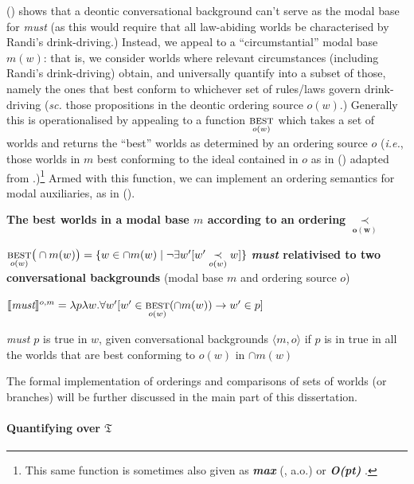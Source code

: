 \documentclass[11pt,dvipsnames]{report}
\providecommand{\denote}[2][]{\ensuremath{\llbracket{#2}\rrbracket^{#1}}}
\begin{document}
\noindent(\lastx) shows that a deontic conversational background can't serve as the modal base for \textit{must} (as this would require that all law-abiding worlds be characterised by Randi's drink-driving.) Instead, we appeal to a ``circumstantial'' modal base $ m(w) $: that is, we consider worlds where relevant circumstances (including Randi's drink-driving) obtain, and universally quantify into a subset of those, namely the ones that best conform to whichever set of rules/laws govern drink-driving (\textit{sc.} those propositions in the deontic ordering source $ o(w) $.) Generally this is operationalised by appealing to a function $ \underset{o(w)}{\textsc{best}}$ which takes a set of worlds and returns the ``best'' worlds as determined by an ordering source $ o $ (\textit{i.e.}, those worlds in $ m $ best conforming to the ideal contained in $ o $ as in (\nextx) adapted from \citealp[61]{VonFintel2011}.)\footnote{This same function is sometimes also given as \textbf{\textit{max}} (\citealp[\textit{e.g.},][]{Hacquard2006,VonFintel2008,VonFintel2011}, a.o.) or \textbf{\textit{O(pt)}} \citep[247]{Schwager2006}.} Armed with this function, we can implement an ordering semantics for modal auxiliaries, as in ().

\ex \textbf{The best worlds in a modal base $ m $ according to an ordering} $\boldsymbol{\underset{o(w)}{\prec}}$

$ \underset{o(w)}{\textsc{best}}\big(\cap{m(w)}\big)=\{w\in\cap m(w)\mid \neg\exists w'[w'\underset{o(w)}{\prec}w]\}$\label{ord-source}\xe
\pex \textbf{\textit{must} relativised to two conversational backgrounds} (modal base $ m $ and ordering source $ o $)

$\denote[o,m]{\textit{must}}=\lambda p\lambda w.\forall w'[w'\in\underset{o(w)}{\textsc{best}}(\cap m(w))\to w'\in p] $

\textit{must $ p $} is true in $ w $, given conversational backgrounds $ \langle{m,o}\rangle $ if $ p $ is in true in all the worlds that are best conforming to $ o(w) $ in $ \cap m(w) $
\xe





The formal implementation of orderings and comparisons of sets of worlds (or branches) will be further discussed in the main part of this dissertation.

\paragraph{Quantifying over $ \mathfrak{T} $}
\end{document}
